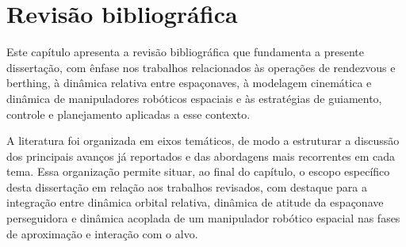 \chapter{Revisão bibliográfica}
\label{sec_Revisao_bibliografica}

Este capítulo apresenta a revisão bibliográfica que fundamenta a presente dissertação, com ênfase nos trabalhos relacionados às operações de rendezvous e berthing, à dinâmica relativa entre espaçonaves, à modelagem cinemática e dinâmica de manipuladores robóticos espaciais e às estratégias de guiamento, controle e planejamento aplicadas a esse contexto.

A literatura foi organizada em eixos temáticos, de modo a estruturar a discussão dos principais avanços já reportados e das abordagens mais recorrentes em cada tema. Essa organização permite situar, ao final do capítulo, o escopo específico desta dissertação em relação aos trabalhos revisados, com destaque para a integração entre dinâmica orbital relativa, dinâmica de atitude da espaçonave perseguidora e dinâmica acoplada de um manipulador robótico espacial nas fases de aproximação e interação com o alvo.


 

 



 



 

 